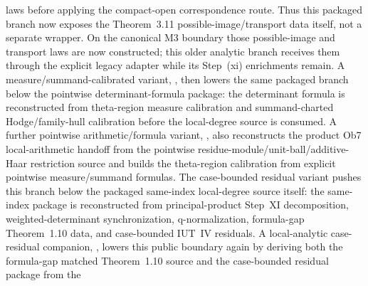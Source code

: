 \documentclass[11pt]{article}
\theoremstyle{plain}
\theoremstyle{definition}
\theoremstyle{remark}
\begin{document}
laws before applying the compact-open correspondence route.  Thus this packaged
branch now exposes the Theorem~3.11 possible-image/transport data itself, not a
separate wrapper.  On the canonical M3 boundary those possible-image and
transport laws are now constructed; this older analytic branch receives them
through the explicit legacy adapter while its Step~(xi) enrichments remain.
A measure/summand-calibrated variant,
\texttt{},
then lowers the same packaged branch below the pointwise determinant-formula
package: the determinant formula is reconstructed from theta-region measure
calibration and summand-charted Hodge/family-hull calibration before the
local-degree source is consumed.
A further pointwise arithmetic/formula variant,
\texttt{},
also reconstructs the product Ob7 local-arithmetic handoff from the
pointwise residue-module/unit-ball/additive-Haar restriction source and builds
the theta-region calibration from explicit pointwise measure/summand formulas.
The case-bounded residual variant
\texttt{}
pushes this branch below the packaged same-index local-degree source itself:
the same-index package is reconstructed from principal-product Step~XI
decomposition, weighted-determinant synchronization, q-normalization,
formula-gap Theorem~1.10 data, and case-bounded IUT~IV residuals.
A local-analytic case-residual companion,
\texttt{},
lowers this public boundary again by deriving both the formula-gap matched
Theorem~1.10 source and the case-bounded residual package from the
\end{document}
